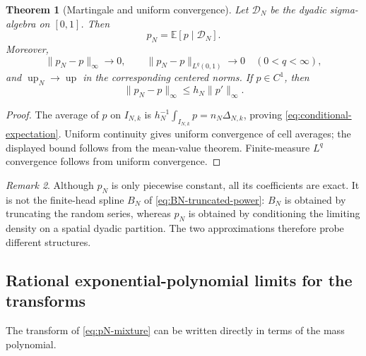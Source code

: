 \documentclass[11pt,oneside]{article}
\newtheorem{theorem}{Theorem}[section]
\theoremstyle{definition}
\theoremstyle{remark}
\newtheorem{remark}[theorem]{Remark}
\newcommand{\E}{\mathbb E}
\newcommand{\Up}{\operatorname{up}}
\begin{document}
\begin{theorem}[Martingale and uniform convergence]
\label{thm:martingale-convergence}
Let $\mathcal D_N$ be the dyadic sigma-algebra on $[0,1]$.  Then
\begin{equation}\label{eq:conditional-expectation}
 p_N=\E[p\mid\mathcal D_N].
\end{equation}
Moreover,
\begin{equation}\label{eq:pN-uniform}
 \|p_N-p\|_\infty\longrightarrow0,
 \qquad
 \|p_N-p\|_{L^q(0,1)}\longrightarrow0
 \quad(0<q<\infty),
\end{equation}
and $\Up_N\to\Up$ in the corresponding centered norms.
If $p\in C^1$, then
\begin{equation}\label{eq:pN-simple-rate}
 \|p_N-p\|_\infty\le h_N\|p'\|_\infty.
\end{equation}
\end{theorem}

\begin{proof}
The average of $p$ on $I_{N,k}$ is
$h_N^{-1}\int_{I_{N,k}}p=n_N\Delta_{N,k}$, proving
\eqref{eq:conditional-expectation}.  Uniform continuity gives uniform
convergence of cell averages; the displayed bound follows from the mean-value
theorem.  Finite-measure $L^q$ convergence follows from uniform convergence.
\end{proof}

\begin{remark}
Although $p_N$ is only piecewise constant, all its coefficients are exact.  It
is not the finite-head spline $B_N$ of \eqref{eq:BN-truncated-power}: $B_N$ is
obtained by truncating the random series, whereas $p_N$ is obtained by
conditioning the limiting density on a spatial dyadic partition.  The two
approximations therefore probe different structures.
\end{remark}

\subsection{Rational exponential-polynomial limits for the transforms}

The transform of \eqref{eq:pN-mixture} can be written directly in terms of the
mass polynomial.
\end{document}
